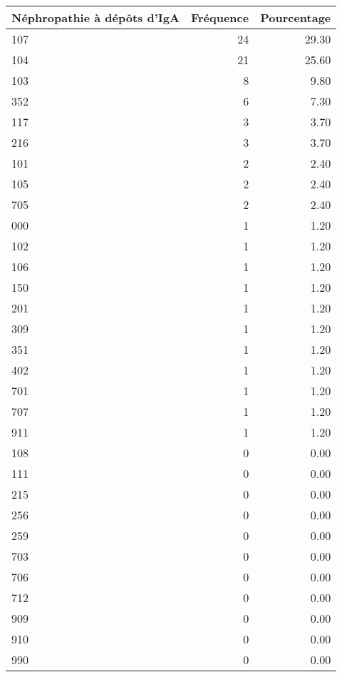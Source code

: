 \documentclass[11pt,a4paper]{article}\usepackage[]{graphicx}\usepackage[]{color}
\begin{document}
\begin{table}[H]
\centering
\begin{tabular}{lrr}
  \hline
Néphropathie à dépôts d'IgA & Fréquence & Pourcentage \\ 
  \hline
107 &  24 & 29.30 \\ 
  104 &  21 & 25.60 \\ 
  103 &   8 & 9.80 \\ 
  352 &   6 & 7.30 \\ 
  117 &   3 & 3.70 \\ 
  216 &   3 & 3.70 \\ 
  101 &   2 & 2.40 \\ 
  105 &   2 & 2.40 \\ 
  705 &   2 & 2.40 \\ 
  000 &   1 & 1.20 \\ 
  102 &   1 & 1.20 \\ 
  106 &   1 & 1.20 \\ 
  150 &   1 & 1.20 \\ 
  201 &   1 & 1.20 \\ 
  309 &   1 & 1.20 \\ 
  351 &   1 & 1.20 \\ 
  402 &   1 & 1.20 \\ 
  701 &   1 & 1.20 \\ 
  707 &   1 & 1.20 \\ 
  911 &   1 & 1.20 \\ 
  108 &   0 & 0.00 \\ 
  111 &   0 & 0.00 \\ 
  215 &   0 & 0.00 \\ 
  256 &   0 & 0.00 \\ 
  259 &   0 & 0.00 \\ 
  703 &   0 & 0.00 \\ 
  706 &   0 & 0.00 \\ 
  712 &   0 & 0.00 \\ 
  909 &   0 & 0.00 \\ 
  910 &   0 & 0.00 \\ 
  990 &   0 & 0.00 \\ 
   \hline
\end{tabular}
\end{table}
\end{document}
